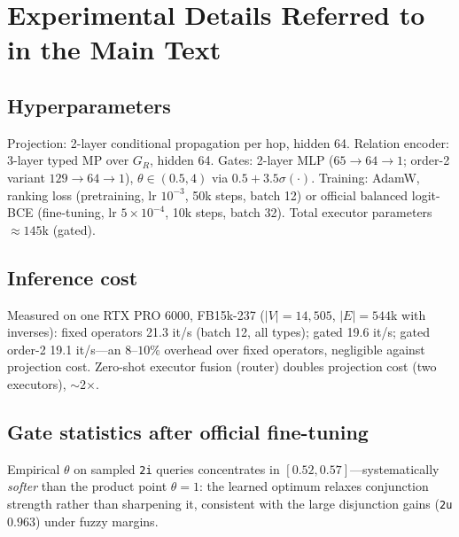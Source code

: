 \documentclass[journal]{IEEEtran}
\begin{document}
\section{Experimental Details Referred to in the Main Text}

\subsection{Hyperparameters}
Projection: 2-layer conditional propagation per hop, hidden 64.
Relation encoder: 3-layer typed MP over $G_R$, hidden 64. Gates: 2-layer
MLP ($65\!\to\!64\!\to\!1$; order-2 variant $129\!\to\!64\!\to\!1$),
$\theta\in(0.5,4)$ via $0.5+3.5\sigma(\cdot)$. Training: AdamW, ranking
loss (pretraining, lr $10^{-3}$, 50k steps, batch 12) or official
balanced logit-BCE (fine-tuning, lr $5\times10^{-4}$, 10k steps, batch
32). Total executor parameters $\approx 145$k (gated).

\subsection{Inference cost}
Measured on one RTX PRO 6000, FB15k-237 ($|V|{=}14{,}505$, $|E|{=}544$k
with inverses): fixed operators 21.3 it/s (batch 12, all types);
gated 19.6 it/s; gated order-2 19.1 it/s---an $8$--$10\%$ overhead over
fixed operators, negligible against projection cost. Zero-shot executor
fusion (router) doubles projection cost (two executors), $\sim$2$\times$.

\subsection{Gate statistics after official fine-tuning}
Empirical $\theta$ on sampled \texttt{2i} queries concentrates in
$[0.52,0.57]$---systematically \emph{softer} than the product point
$\theta=1$: the learned optimum relaxes conjunction strength rather than
sharpening it, consistent with the large disjunction gains
(\texttt{2u} $0.963$) under fuzzy margins.
\end{document}

